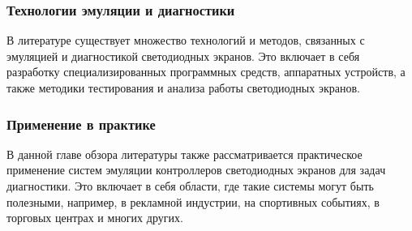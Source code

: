 \subsubsection{Технологии эмуляции и диагностики}

В литературе существует множество технологий и методов, связанных с эмуляцией и диагностикой светодиодных экранов. Это включает в себя разработку специализированных программных средств, аппаратных устройств, а также методики тестирования и анализа работы светодиодных экранов.

\subsubsection{Применение в практике}

В данной главе обзора литературы также рассматривается практическое применение систем эмуляции контроллеров светодиодных экранов для задач диагностики. Это включает в себя области, где такие системы могут быть полезными, например, в рекламной индустрии, на спортивных событиях, в торговых центрах и многих других.